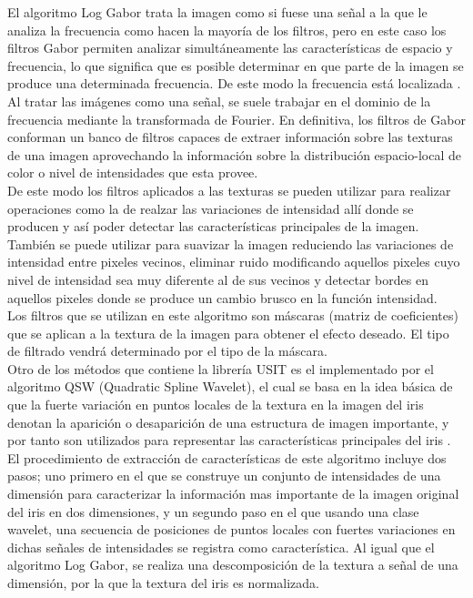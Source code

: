 El algoritmo Log Gabor trata la imagen como si fuese una señal a la que le analiza la frecuencia como hacen la mayoría de los filtros, pero en este caso los filtros Gabor permiten analizar simultáneamente las características de espacio y frecuencia, lo que significa que es posible determinar en que parte de la imagen se produce una determinada frecuencia. De este modo la frecuencia está localizada \cite{Reference18} \cite{Reference19}. \\

Al tratar las imágenes como una señal, se suele trabajar en el dominio de la frecuencia mediante la transformada de Fourier. En definitiva, los filtros de Gabor conforman un banco de filtros capaces de extraer información sobre las texturas de una imagen aprovechando la información sobre la distribución espacio-local de color o nivel de intensidades que esta provee. \\

De este modo los filtros aplicados a las texturas se pueden utilizar para realizar operaciones como la de realzar las variaciones de intensidad allí donde se producen y así poder detectar las características principales de la imagen. También se puede utilizar para suavizar la imagen reduciendo las variaciones de intensidad entre pixeles vecinos, eliminar ruido modificando aquellos pixeles cuyo nivel de intensidad sea muy diferente al de sus vecinos y detectar bordes en aquellos pixeles donde se produce un cambio brusco en la función intensidad. \\

Los filtros que se utilizan en este algoritmo son máscaras (matriz de coeficientes) que se aplican a la textura de la imagen para obtener el efecto deseado. El tipo de filtrado vendrá determinado por el tipo de la máscara. \\

Otro de los métodos que contiene la librería USIT es el implementado por el algoritmo QSW (Quadratic Spline Wavelet), el cual se basa en la idea básica de que la fuerte variación en puntos locales de la textura en la imagen del iris denotan la aparición o desaparición de una estructura de imagen importante, y por tanto son utilizados para representar las características principales del iris \cite{Reference18} \cite{Reference19}.\\

El procedimiento de extracción de características de este algoritmo incluye dos pasos; uno primero en el que se construye un conjunto de intensidades de una dimensión para caracterizar la información mas importante de la imagen original del iris en dos dimensiones, y un segundo paso en el que usando una clase wavelet, una secuencia de posiciones de puntos locales con fuertes variaciones en dichas señales de intensidades se registra como característica. Al igual que el algoritmo Log Gabor, se realiza una descomposición de la textura a señal de una dimensión, por la que la textura del iris es normalizada. \\

